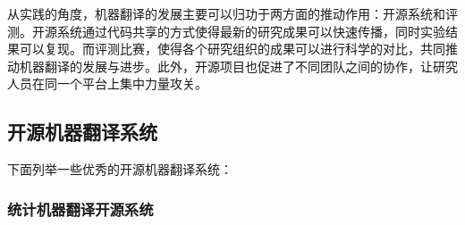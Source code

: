 \parinterval 从实践的角度，机器翻译的发展主要可以归功于两方面的推动作用：开源系统和评测。开源系统通过代码共享的方式使得最新的研究成果可以快速传播，同时实验结果可以复现。而评测比赛，使得各个研究组织的成果可以进行科学的对比，共同推动机器翻译的发展与进步。此外，开源项目也促进了不同团队之间的协作，让研究人员在同一个平台上集中力量攻关。


\subsection{开源机器翻译系统}


下面列举一些优秀的开源机器翻译系统：


\subsubsection{统计机器翻译开源系统}

